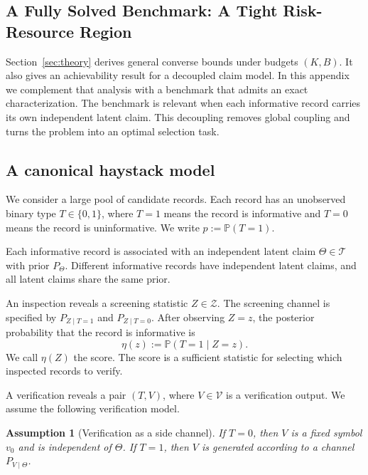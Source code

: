\documentclass[twocolumn]{scholar7}
\newtheorem{assumption}[theorem]{Assumption}
\newcommand{\cT}{\mathcal{T}}
\newcommand{\cV}{\mathcal{V}}
\newcommand{\cZ}{\mathcal{Z}}
\newcommand{\Prob}{\mathbb{P}}
\begin{document}

\begin{appendix}
    
\section{A Fully Solved Benchmark: A Tight Risk-Resource Region}
\label{app:tight-benchmark}

Section~\ref{sec:theory} derives general converse bounds under budgets $(K,B)$.
It also gives an achievability result for a decoupled claim model.
In this appendix we complement that analysis with a benchmark that admits an exact characterization.
The benchmark is relevant when each informative record carries its own independent latent claim.
This decoupling removes global coupling and turns the problem into an optimal selection task.

\subsection{A canonical haystack model}
We consider a large pool of candidate records.
Each record has an unobserved binary type $T\in\{0,1\}$, where $T=1$ means the record is informative and $T=0$ means the record is uninformative.
We write $p:=\Prob(T=1)$.

Each informative record is associated with an independent latent claim $\Theta\in\cT$ with prior $P_\Theta$.
Different informative records have independent latent claims, and all latent claims share the same prior.

An inspection reveals a screening statistic $Z\in\cZ$.
The screening channel is specified by $P_{Z\mid T=1}$ and $P_{Z\mid T=0}$.
After observing $Z=z$, the posterior probability that the record is informative is
\begin{equation}
  \eta(z) := \Prob(T=1\mid Z=z).
  \label{eq:eta-def}
\end{equation}
We call $\eta(Z)$ the score.
The score is a sufficient statistic for selecting which inspected records to verify.

A verification reveals a pair $(T,V)$, where $V\in\cV$ is a verification output.
We assume the following verification model.

\begin{assumption}[Verification as a side channel]
\label{asmp:verification-sidechannel}
If $T=0$, then $V$ is a fixed symbol $v_0$ and is independent of $\Theta$.
If $T=1$, then $V$ is generated according to a channel $P_{V\mid \Theta}$.
\end{assumption}


\end{appendix}
\end{document}
